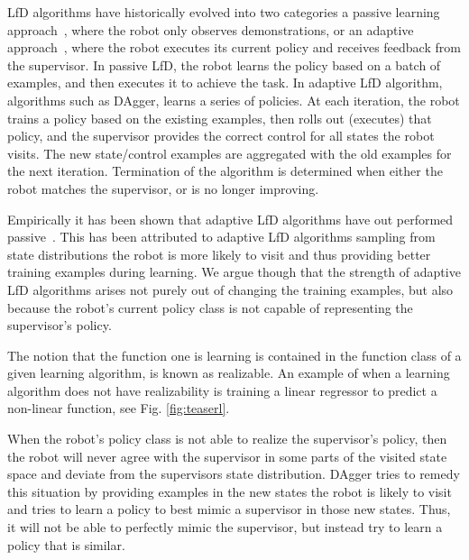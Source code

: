 \documentclass[10pt, conference]{ieeeconf}      %
\begin{document}
LfD algorithms have historically evolved into two categories a passive learning approach~\cite{pomerleau1989alvinn}, where the robot only observes demonstrations, or an adaptive approach~\cite{ross2010reduction}, where the robot executes its current policy and receives feedback from the supervisor. In passive LfD, the robot learns the policy based on a batch of examples, and then executes it to achieve the task.  In adaptive LfD algorithm, algorithms such as DAgger, learns a series of policies. At each iteration, the robot trains a policy based on the existing examples, then rolls out (executes) that policy, and the supervisor provides the correct control for all states the robot visits. The new state/control examples are aggregated with the old examples for the next iteration. Termination of the algorithm is determined when either the robot matches the supervisor, or is no longer improving. 


Empirically it has been shown that adaptive LfD algorithms have out performed passive~\cite{ross2010efficient,ross2010reduction,ross2013learning}. This has been attributed to adaptive LfD algorithms sampling from state distributions the robot is more likely to visit and thus providing better training examples during learning.  We argue though  that the strength of adaptive LfD algorithms arises not purely out of changing the training examples, but also because the robot's current policy class is not capable of representing the supervisor's policy. 

The notion that the function one is learning is contained in the function class of a given learning algorithm, is known as realizable. An example of when a learning algorithm does not have realizability is training a linear regressor to predict a non-linear function, see Fig. \ref{fig:teaserl}.

When the robot's policy class is not able to realize the supervisor's policy, then the robot will never agree with the supervisor in some parts of the visited state space and deviate from the supervisors state distribution. DAgger tries to remedy this situation by providing examples in the new states the robot is likely to visit and tries to learn a policy to best mimic a supervisor in those new states. Thus, it will not be able to perfectly mimic the supervisor, but instead try to learn a policy that is similar. 
\end{document}
